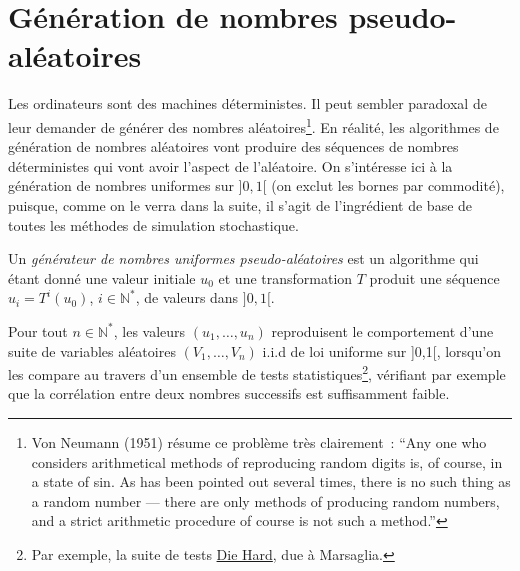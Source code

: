\chapter{Génération de nombres
pseudo-aléatoires}\label{V-guxe9nuxe9ration-de-nombres-pseudo-aluxe9atoires-1}

Les ordinateurs sont des machines déterministes. Il peut sembler
paradoxal de leur demander de générer des nombres aléatoires\footnote{Von
  Neumann (1951) résume ce problème très clairement~: ``Any one who
  considers arithmetical methods of reproducing random digits is, of
  course, in a state of sin. As has been pointed out several times,
  there is no such thing as a random number --- there are only methods
  of producing random numbers, and a strict arithmetic procedure of
  course is not such a method.''}. En réalité, les algorithmes de
génération de nombres aléatoires vont produire des séquences de nombres
déterministes qui vont avoir l'aspect de l'aléatoire. On s'intéresse ici
à la génération de nombres uniformes sur \(]0,1[\) (on exclut les bornes
par commodité), puisque, comme on le verra dans la suite, il s'agit de
l'ingrédient de base de toutes les méthodes de simulation stochastique.

\begin{definition}\label{V-guxe9nuxe9rateur-de-nombres-uniformes-pseudo-aluxe9atoires}

Un \emph{générateur de nombres uniformes pseudo-aléatoires} est un
algorithme qui étant donné une valeur initiale \(u_0\) et une
transformation \(T\) produit une séquence \(u_i=T^i(u_0)\),
\(i \in\mathbb{N}^\ast\), de valeurs dans \(]0,1[\).

Pour tout \(n\in\mathbb{N}^\ast\), les valeurs \((u_1,\ldots,u_n)\)
reproduisent le comportement d'une suite de variables aléatoires
\((V_1,\ldots,V_n)\) i.i.d de loi uniforme sur {]}0,1{[}, lorsqu'on les
compare au travers d'un ensemble de tests statistiques\footnote{Par
  exemple, la suite de tests
  \href{https://en.wikipedia.org/wiki/Diehard_tests}{Die Hard}, due à
  Marsaglia.}, vérifiant par exemple que la corrélation entre deux
nombres successifs est suffisamment faible.
\end{definition}

